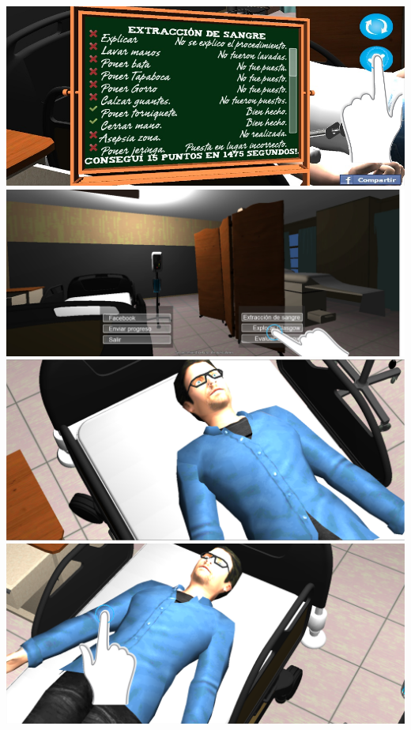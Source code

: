 \begin{frame}
\begin{overprint}
 \includegraphics[width=\textwidth]{imagenes/flujo/flujo8.png} 
 \includegraphics[width=\textwidth]{imagenes/flujo/flujo9.png}
 \includegraphics[width=\textwidth]{imagenes/flujo/flujo10.png}
 \includegraphics[width=\textwidth]{imagenes/flujo/flujo12.png}

\end{overprint}
\end{frame}
